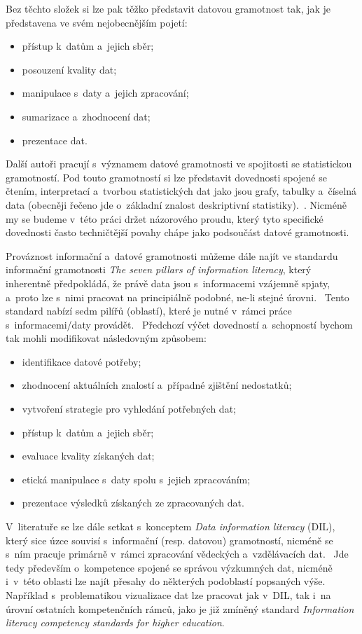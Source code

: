 Bez těchto složek si lze pak těžko představit datovou gramotnost tak, jak je představena ve svém nejobecnějším pojetí:~\parencite[8]{schield05}

\begin{itemize}
\tightlist
\item
  přístup k~datům a~jejich sběr;
\item
  posouzení kvality dat;
\item
  manipulace s~daty a~jejich zpracování;
\item
  sumarizace a~zhodnocení dat;
\item
  prezentace dat.
\end{itemize}

Další autoři pracují s~významem datové gramotnosti ve spojitosti se statistickou gramotností. Pod touto gramotností si lze představit dovednosti spojené se čtením, interpretací a~tvorbou statistických dat jako jsou grafy, tabulky a~číselná data (obecněji řečeno jde o~základní znalost deskriptivní statistiky).~\parencite[8]{schield05}. Nicméně my se budeme v~této práci držet názorového proudu, který tyto specifické dovednosti často techničtější povahy chápe jako podsoučást datové gramotnosti.~\parencite[125]{calzada13}

Prováznost informační a~datové gramotnosti můžeme dále najít ve standardu informační gramotnosti \emph{The seven pillars of information literacy}, který inherentně předpokládá, že právě data jsou s~informacemi vzájemně spjaty, a~proto lze s~nimi pracovat na principiálně podobné, ne-li stejné úrovni.~\parencite[126]{calzada13} Tento standard nabízí sedm pilířů (oblastí), které je nutné v~rámci práce s~informacemi/daty provádět.~\parencite{sconul11} Předchozí výčet dovedností a~schopností bychom tak mohli modifikovat následovným způsobem:

\begin{itemize}
\tightlist
\item
  identifikace datové potřeby;
\item
  zhodnocení aktuálních znalostí a~případné zjištění nedostatků;
\item
  vytvoření strategie pro vyhledání potřebných dat;
\item
  přístup k~datům a~jejich sběr;
\item
  evaluace kvality získaných dat;
\item
  etická manipulace s~daty spolu s~jejich zpracováním;
\item
  prezentace výsledků získaných ze zpracovaných dat.
\end{itemize}

V~literatuře se lze dále setkat s~konceptem \emph{Data information literacy} (DIL), který sice úzce souvisí s~informační (resp. datovou) gramotností, nicméně se s~ním pracuje primárně v~rámci zpracování vědeckých a~vzdělávacích dat.~\parencite{jeffryes13} Jde tedy především o~kompetence spojené se správou výzkumných dat, nicméně i~v~této oblasti lze najít přesahy do některých podoblastí popsaných výše. Například s~problematikou vizualizace dat lze pracovat jak v~DIL, tak i~na úrovní ostatních kompetenčních rámců, jako je již zmíněný standard \emph{Information literacy competency standards for higher education}.
